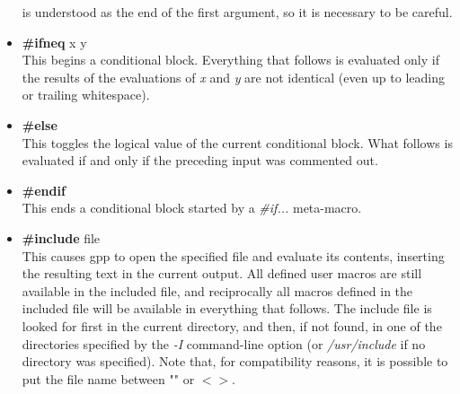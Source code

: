 \begin{itemize}
is understood as the end of the first argument, so it is necessary to be
careful.
\item
{\bf \#ifneq } x y\\
This begins a conditional block. Everything that follows is evaluated only
if the results of the evaluations of {\it x} and {\it y} are not identical
(even up to leading or trailing whitespace).
\item
{\bf \#else} \\
This toggles the logical value of the current conditional block. What
follows is evaluated if and only if the preceding input was commented out.
\item
{\bf \#endif} \\
This ends a conditional block started by a {\it \#if...} meta-macro.
\item
{\bf \#include } file\\
This causes gpp to open the specified file and evaluate its contents,
inserting the resulting text in the current output. All defined user macros
are still available in the included file, and reciprocally all macros
defined in the included file will be available in everything that
follows. The include file is looked for first in the current directory,
and then, if not found, in one of the directories specified by the {\it -I}
command-line option (or {\it /usr/include} if no directory was specified).
Note that, for compatibility reasons, it is possible to put the file name 
between "" or $<$$>$.



\end{itemize}
